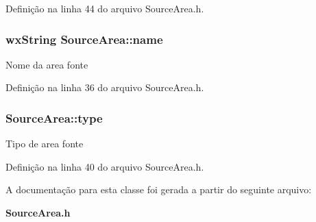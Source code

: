 Definição na linha 44 do arquivo Source\+Area.\+h.

\subsubsection[{name}]{\setlength{\rightskip}{0pt plus 5cm}wx\+String Source\+Area\+::name}\label{class_source_area_aaafd26587d3cb37628849e6632416d10}
Nome da area fonte 

Definição na linha 36 do arquivo Source\+Area.\+h.

\subsubsection[{type}]{ Source\+Area\+::type}\label{class_source_area_a69dc5b1f66cda3e7d7a2d64841071ced}
Tipo de area fonte 

Definição na linha 40 do arquivo Source\+Area.\+h.



A documentação para esta classe foi gerada a partir do seguinte arquivo\+:\begin{DoxyCompactItemize}
\item 
{\bf Source\+Area.\+h}\end{DoxyCompactItemize}
